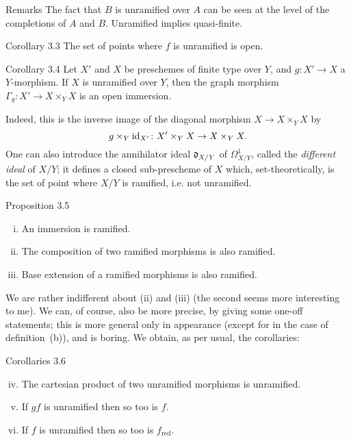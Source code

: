 \begin{rmenv}{Remarks}
  The fact that $B$ is unramified over $A$ can be seen at the level of the completions of $A$ and $B$.
  Unramified implies quasi-finite.
\end{rmenv}

\begin{itenv}{Corollary 3.3}
\label{I.3.3}
  The set of points where $f$ is unramified is open.
\end{itenv}

\begin{itenv}{Corollary 3.4}
\label{I.3.4}
  Let $X'$ and $X$ be preschemes of finite type over $Y$, and $g\colon X'\to X$ a $Y$-morphism.
  If $X$ is unramified over $Y$, then the graph morphism $\Gamma_g\colon X'\to X\times_Y X$ is an open immersion.
\end{itenv}

Indeed, this is the inverse image of the diagonal morphism $X\to X\times_Y X$ by
\[
  g\times_Y \id_{X'}\colon X'\times_Y X\to X\times_Y X.
\]
One can also introduce the annihilator ideal $\frak{d}_{X/Y}$ of $\Omega_{X/Y}^1$, called the \emph{different ideal} of $X/Y$;
it defines a closed sub-prescheme of $X$ which, set-theoretically, is the set of point where $X/Y$ is ramified, i.e. not unramified.

\begin{itenv}{Proposition 3.5}
\label{I.3.5}
  \begin{enumerate}[(i)]
    \item An immersion is ramified.
    \item The composition of two ramified morphisms is also ramified.
    \item Base extension of a ramified morphisms is also ramified.
  \end{enumerate}
\end{itenv}

We are rather indifferent about (ii) and (iii) (the second seems more interesting to me).
We can, of course, also be more precise, by giving some one-off statements;
this is more general only in appearance (except for in the case of definition~(b)), and is boring.
We obtain, as per usual, the corollaries:

\begin{itenv}{Corollaries 3.6}
\label{I.3.6}
  \begin{enumerate}[(i)]
    \setcounter{enumi}{3}
    \item The cartesian product of two unramified morphisms is unramified.
    \item If $gf$ is unramified then so too is $f$.
    \item If $f$ is unramified then so too is $f_\text{red}$.
  \end{enumerate}
\end{itenv}

